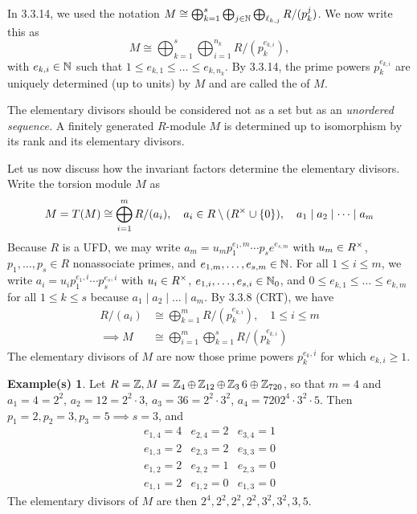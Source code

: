 \documentclass[11pt]{book}
\theoremstyle{definition}   \newtheorem{defn}[counter]{Definition} %
\newtheorem*{example*}{Example(s)}   \newtheorem*{warning}{Warning}
\newcommand{\bs}{\setminus}   \newcommand{\A}{\mathcal{A}}   \newcommand{\sy}{\textnormal{Syl}}   \newcommand{\size}[1]{\left| #1 \right|}
\newcommand{\vs}{\vspace{8pt}}
\numberwithin{counter}{chapter}
\begin{document}
\vs

In 3.3.14, we used the notation $M \cong \bigoplus_{k=1}^s \bigoplus_{j \in \operatorname{\mathbb{N}}} \bigoplus_{\ell_{k,j}} R/(p_k^j)$. We now write this as 
	\[M \cong \bigoplus_{k=1}^s \bigoplus_{i=1}^{n_k} R/(p_k^{e_{k,i}}), \]
with $e_{k,i} \in \operatorname{\mathbb{N}}$ such that $1 \leq e_{k,1} \leq \dots \leq e_{k,n_k}$. By 3.3.14, the prime powers $p_k^{e_{k,i}}$ are uniquely determined (up to units) by $M$ and are called the  of $M$. 

\vs

\begin{remark}[+ Discussion]
The elementary divisors should be considered not as a set but as an \emph{unordered sequence.} A finitely generated $R$-module $M$ is determined up to isomorphism by its rank and its elementary divisors. 

Let us now discuss how the invariant factors determine the elementary divisors. Write the torsion module $M$ as 
	\[M = T(M) \cong \bigoplus_{i=1}^m R/(a_i), \quad a_i \in R\bs(R\x \cup \{0\}), \quad a_1 \mid a_2 \mid \dots \mid a_m \]
Because $R$ is a UFD, we may write $a_m = u_m p_1^{e_1,m} \cdots p_s e^{e_{s,m}}$ with $u_m \in R^{\times}$, $p_1,\dots,p_s \in R$ nonassociate primes, and $e_{1,m},\dots,e_{s,m} \in \operatorname{\mathbb{N}}$. For all $1 \leq i \leq m$, we write $a_i = u_i p_1 ^{e_1,i} \cdots p_s ^{e_s,i}$ with $u_i \in R^{\times}$, $e_{1,i},\dots,e_{s,i} \in \operatorname{\mathbb{N}}_0$, and $0 \leq e_{k,1} \leq \dots \leq e_{k,m}$ for all $1 \leq k \leq s$ because $a_1 \mid a_2 \mid \dots \mid a_m$. By 3.3.8 (CRT), we have
\begin{align*}
R/(a_i) &\cong \bigoplus_{k=1}^m R/(p_k^{e_{k,i}}), \quad 1 \leq i \leq m \\
\implies M &\cong \bigoplus_{i=1}^m \bigoplus_{k=1}^s R/(p_k^{e_{k,i}}) 
\end{align*}
The elementary divisors of $M$ are now those prime powers $p_k^{e_k,i}$ for which $e_{k,i} \geq 1$. 

\vs

\begin{example*}
Let $R = \operatorname{\mathbb{Z}}, M = \operatorname{\mathbb{Z}}_4 \oplus \operatorname{\mathbb{Z}}_{12} \oplus \operatorname{\mathbb{Z}}_36 \oplus \operatorname{\mathbb{Z}}_{720}$, so that $m = 4$ and $a_1 = 4 = 2^2$, $a_2 = 12 = 2^2 \cdot 3$, $a_3 = 36 = 2^2 \cdot 3^2$, $a_4 = 720 2^4 \cdot 3^2 \cdot 5$. Then $p_1 = 2, p_2 = 3, p_3 = 5 \implies s=3$, and
\[\begin{array}{rrr}
e_{1,4} = 4 & e_{2,4} = 2 & e_{3,4} = 1 \\
e_{1,3} = 2 & e_{2,3} = 2 & e_{3,3} = 0 \\
e_{1,2} = 2 & e_{2,2} = 1 & e_{2,3} = 0 \\
e_{1,1} = 2 & e_{1,2} = 0 & e_{1,3} = 0
\end{array} \]
The elementary divisors of $M$ are then $2^4,2^2,2^2,2^2,3^2,3^2,3,5$. 
\end{example*}


\end{remark}
\end{document}
